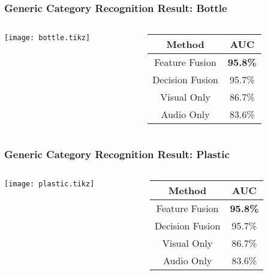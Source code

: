 \documentclass{beamer}
\begin{document}
  \begin{frame}
    \frametitle{Generic Category Recognition Result: Bottle}
    
    \begin{columns}
      \begin{column}{.6\textwidth}
        \centering
        \footnotesize
        \texttt{[image: bottle.tikz]}
      \end{column}
      \begin{column}{.4\textwidth}
        \footnotesize
        \begin{tabular}[h]{c|c}
          \hline
          Method & AUC \\ \hline \hline
          Feature Fusion & \textbf{95.8\%} \\ \hline
          Decision Fusion  & 95.7\% \\ \hline
          Visual Only & 86.7\% \\ \hline
          Audio Only & 83.6\% \\ \hline
        \end{tabular}
      \end{column}
    \end{columns}
  \end{frame}

  \begin{frame}
    \frametitle{Generic Category Recognition Result: Plastic}
    
    \begin{columns}
      \begin{column}{.6\textwidth}
        \centering
        \footnotesize
        \texttt{[image: plastic.tikz]}
      \end{column}
      \begin{column}{.4\textwidth}
        \footnotesize
        \begin{tabular}[h]{c|c}
          \hline
          Method & AUC \\ \hline \hline
          Feature Fusion & \textbf{95.8\%} \\ \hline
          Decision Fusion  & 95.7\% \\ \hline
          Visual Only & 86.7\% \\ \hline
          Audio Only & 83.6\% \\ \hline
        \end{tabular}
      \end{column}
    \end{columns}
  \end{frame}
\end{document}
